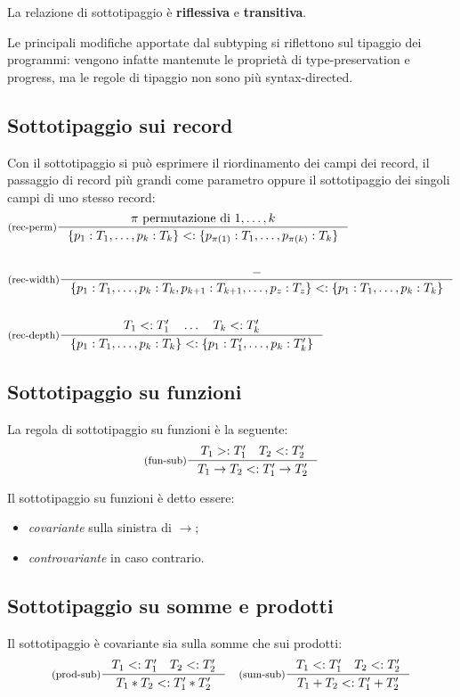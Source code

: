 \documentclass[a4paper, 11pt]{article}
\begin{document}
La relazione di sottotipaggio è \textbf{riflessiva} e \textbf{transitiva}.

Le principali modifiche apportate dal subtyping si riflettono sul tipaggio dei programmi: vengono infatte mantenute le proprietà di type-preservation e progress, ma le regole di tipaggio non sono più syntax-directed.

\subsection{Sottotipaggio sui record}
Con il sottotipaggio si può esprimere il riordinamento dei campi dei record, il passaggio di record più grandi come parametro oppure il sottotipaggio dei singoli campi di uno stesso record:
\begin{align*}
		&\inference[(rec-perm)]{\pi \text{ permutazione di } 1,\dots,k}{\lbrace p_1:T_1, \dots, p_k:T_k \rbrace <: \lbrace p_{\pi (1)}:T_1, \dots, p_{\pi (k)}:T_k \rbrace } \\ \\
		&\inference[(rec-width)]{-}{\lbrace p_1:T_1, \dots, p_k:T_k,p_{k+1}:T_{k+1}, \dots, p_z:T_z \rbrace <: \lbrace p_1:T_1, \dots, p_k:T_k \rbrace } \\ \\
		&\inference[(rec-depth)]{T_1 <: T_1' \quad \dots \quad T_k<:T_k'}{\lbrace p_1:T_1, \dots, p_k:T_k \rbrace <: \lbrace p_1:T_1', \dots, p_k:T_k' \rbrace }
\end{align*} 

\subsection{Sottotipaggio su funzioni}
La regola di sottotipaggio su funzioni è la seguente: 
\[ 
	\inference[(fun-sub)]{T_1 >: T_1' \quad T_2 <: T_2'}{T_1 \to T_2 <: T_1' \to T_2'}
\]

Il sottotipaggio su funzioni è detto essere: \begin{itemize}
	\item \textit{covariante} sulla sinistra di $\to$;
	\item \textit{controvariante} in caso contrario.
\end{itemize}

\subsection{Sottotipaggio su somme e prodotti}
Il sottotipaggio è covariante sia sulla somme che sui prodotti: 
\begin{align*}
	\inference[(prod-sub)]{T_1<:T_1' \quad T_2<:T_2'}{T_1 \ast T_2 <: T_1' \ast T_2'} \quad
	\inference[(sum-sub)]{T_1 <:T_1' \quad T_2<:T_2'}{T_1 + T_2 <: T_1' + T_2'}
\end{align*}
\end{document}
